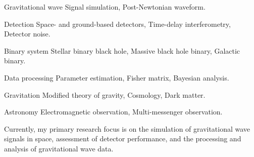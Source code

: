 

\begin{cvskills}

  \cvskill
    {Gravitational wave} %
    {Signal simulation, Post-Newtonian waveform.} %

  \cvskill
    {Detection} %
    {Space- and ground-based detectors, Time-delay interferometry, Detector noise.} %

  \cvskill
    {Binary system} %
    {Stellar binary black hole, Massive black hole binary, Galactic binary.} %

  \cvskill
    {Data processing} %
    {Parameter estimation, Fisher matrix, Bayesian analysis.} %

  \cvskill
    {Gravitation} %
    {Modified theory of gravity, Cosmology, Dark matter.} %

  \cvskill
    {Astronomy} %
    {Electromagnetic observation, Multi-messenger observation.} %


\end{cvskills}

\begin{cvparagraph}
Currently, my primary research focus is on the simulation of gravitational wave signals in space, assessment of detector performance, and the processing and analysis of gravitational wave data.
\end{cvparagraph}